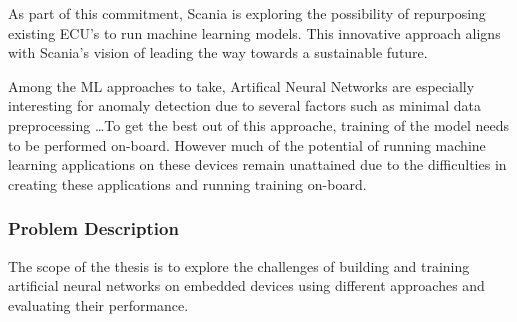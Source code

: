 As part of this commitment, Scania is exploring the possibility of repurposing existing ECU's to run machine learning models. This innovative approach aligns with Scania's vision of leading the way towards a sustainable future.





Among the ML approaches to take, Artifical Neural Networks are especially interesting for anomaly detection due to several factors such as minimal data preprocessing \dots To get the best out of this approache, training of the model needs to be performed on-board. However much of the potential of running machine learning applications on these devices remain unattained due to the difficulties in creating these applications and running training on-board.

\subsubsection{Problem Description}

The scope of the thesis is to explore the challenges of building and training artificial neural networks on embedded devices using different approaches and evaluating their performance.




